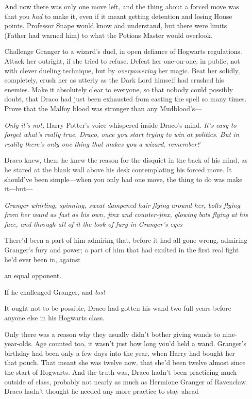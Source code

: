 And now there was only one move left, and the thing about a forced move was
that you \emph{had} to make it, even if it meant getting detention and losing
House points. Professor Snape would know and understand, but there were limits
(Father had warned him) to what the Potions Master would overlook.

Challenge Granger to a wizard's duel, in open defiance of Hogwarts regulations.
Attack her outright, if she tried to refuse. Defeat her one-on-one, in public,
not with clever dueling technique, but by \emph{overpowering} her magic. Beat
her solidly, completely, crush her as utterly as the Dark Lord himself had
crushed his enemies. Make it absolutely clear to everyone, so that nobody could
possibly doubt, that Draco had just been exhausted from casting the spell so
many times. Prove that the Malfoy blood was stronger than any Mudblood's—

\emph{Only it's not,} Harry Potter's voice whispered inside Draco's mind.
\emph{It's easy to forget what's really true, Draco, once you start trying to
win at politics. But in reality there's only one thing that makes you a wizard,
remember?}

Draco knew, then, he knew the reason for the disquiet in the back of his mind,
as he stared at the blank wall above his desk contemplating his forced move. It
should've been simple—when you only had one move, the thing to do was make
it—but—

\emph{Granger whirling, spinning, sweat-dampened hair flying around her, bolts
flying from her wand as fast as his own, jinx and counter-jinx, glowing bats
flying at his face, and through all of it the look of fury in Granger's eyes—}

There'd been a part of him admiring that, before it had all gone wrong,
admiring Granger's fury and power; a part of him that had exulted in the first
real fight he'd ever been in, against{\el}

{\el} an equal opponent.

If he challenged Granger, and \emph{lost{\el}}

It ought not to be possible, Draco had gotten his wand two full years before
anyone else in his Hogwarts class.

Only there was a reason why they usually didn't bother giving wands to
nine-year-olds. Age counted too, it wasn't just how long you'd held a wand.
Granger's birthday had been only a few days into the year, when Harry had
bought her that pouch. That meant she was twelve now, that she'd been twelve
almost since the start of Hogwarts. And the truth was, Draco hadn't been
practicing much outside of class, probably not nearly as much as Hermione
Granger of Ravenclaw. Draco hadn't thought he needed any more practice to stay
ahead{\el}

